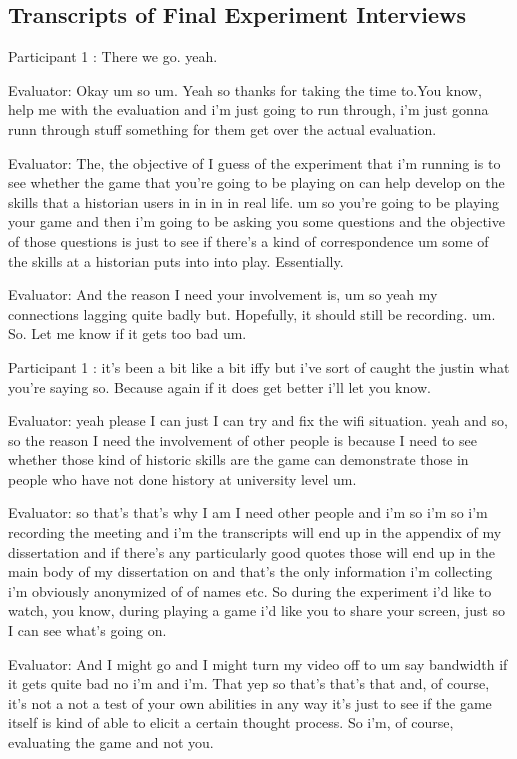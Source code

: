 \documentclass{l4proj}
\begin{document}
\begin{appendices}
\chapter{Transcripts of Final Experiment Interviews}

Participant 1 : There we go. yeah.

Evaluator: Okay um so um. Yeah so thanks for taking the time to.You know, help me with the evaluation and i'm just going to run through, i'm just gonna runn through stuff something for them get over the actual evaluation.

Evaluator: The, the objective of I guess of the experiment that i'm running is to see whether the game that you're going to be playing on can help develop on the skills that a historian users in in in in real life. um so you're going to be playing your game and then i'm going to be asking you some questions and the objective of those questions is just to see if there's a kind of correspondence um some of the skills at a historian puts into into play. Essentially.

Evaluator: And the reason I need your involvement is, um so yeah my connections lagging quite badly but. Hopefully, it should still be recording. um. So. Let me know if it gets too bad um.

Participant 1 : it's been a bit like a bit iffy but i've sort of caught the justin what you're saying so. Because again if it does get better i'll let you know.

Evaluator: yeah please I can just I can try and fix the wifi situation. yeah and so, so the reason I need the involvement of other people is because I need to see whether those kind of historic skills are the game can demonstrate those in people who have not done history at university level um. 

Evaluator: so that's that's why I am I need other people and i'm so i'm so i'm recording the meeting and i'm the transcripts will end up in the appendix of my dissertation and if there's any particularly good quotes those will end up in the main body of my dissertation on and that's the only information i'm collecting i'm obviously anonymized of of names etc. So during the experiment i'd like to watch, you know, during playing a game i'd like you to share your screen, just so I can see what's going on.

Evaluator: And I might go and I might turn my video off to um say bandwidth if it gets quite bad no i'm and i'm. That yep so that's that's that and, of course, it's not a not a test of your own abilities in any way it's just to see if the game itself is kind of able to elicit a certain thought process. So i'm, of course, evaluating the game and not you.


\end{appendices}
\end{document}
